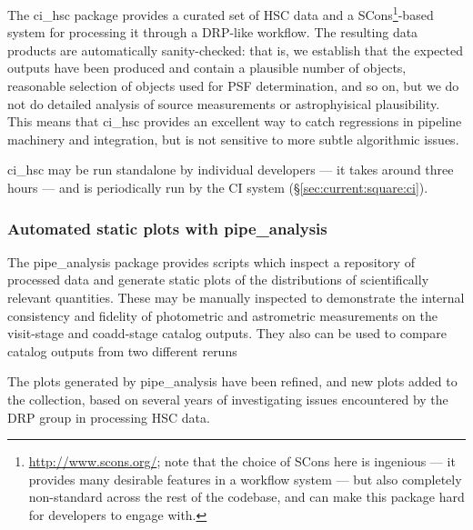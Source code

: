 \documentclass[DM,authoryear,toc,lsstdraft]{lsstdoc}
\begin{document}
The ci\_hsc package provides a curated set of HSC data and a
SCons\footnote{\url{http://www.scons.org/}; note that the choice of SCons here
is ingenious --- it provides many desirable features in a workflow system ---
but also completely non-standard across the rest of the codebase, and can make
this package hard for developers to engage with.}-based system for processing
it through a DRP-like workflow. The resulting data products are automatically
sanity-checked: that is, we establish that the expected outputs have been
produced and contain a plausible number of objects, reasonable selection of
objects used for PSF determination, and so on, but we do not do detailed
analysis of source measurements or astrophyisical plausibility. This means
that ci\_hsc provides an excellent way to catch regressions in pipeline
machinery and integration, but is not sensitive to more subtle algorithmic
issues.

ci\_hsc may be run standalone by individual developers --- it takes around
three hours --- and is periodically run by the CI system
(\S\ref{sec:current:square:ci}).

\subsubsection{Automated static plots with pipe\_analysis}
\label{sec:current:drp:pipeanalysis}

The pipe\_analysis package provides scripts which inspect a repository of
processed data and generate static plots of the distributions of
scientifically relevant quantities. These may be manually inspected to
demonstrate the internal consistency and fidelity of photometric and
astrometric measurements on the visit-stage and coadd-stage catalog outputs.
They also can be used to compare catalog outputs from two different reruns

The plots generated by pipe\_analysis have been refined, and new plots added
to the collection, based on several years of investigating issues encountered
by the DRP group in processing HSC data.
\end{document}
